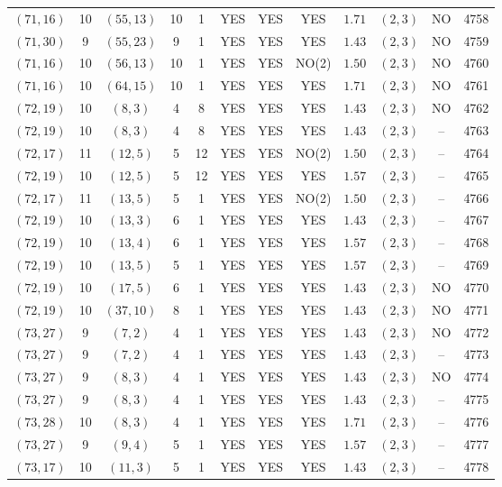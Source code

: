 \begin{longtable}{|c|c|c|c|c|c|c|c|c|c|c|c|}
$(71,16)$ & 10 & $(55,13)$ & 10 & 1 & YES & YES & YES & $1.71$ & $(2,3)$ & NO & 4758\\
$(71,30)$ & 9 & $(55,23)$ & 9 & 1 & YES & YES & YES & $1.43$ & $(2,3)$ & NO & 4759\\
$(71,16)$ & 10 & $(56,13)$ & 10 & 1 & YES & YES & NO(2) & $1.50$ & $(2,3)$ & NO & 4760\\
$(71,16)$ & 10 & $(64,15)$ & 10 & 1 & YES & YES & YES & $1.71$ & $(2,3)$ & NO & 4761\\
$(72,19)$ & 10 & $(8,3)$ & 4 & 8 & YES & YES & YES & $1.43$ & $(2,3)$ & NO & 4762\\
$(72,19)$ & 10 & $(8,3)$ & 4 & 8 & YES & YES & YES & $1.43$ & $(2,3)$ & -- & 4763\\
$(72,17)$ & 11 & $(12,5)$ & 5 & 12 & YES & YES & NO(2) & $1.50$ & $(2,3)$ & -- & 4764\\
$(72,19)$ & 10 & $(12,5)$ & 5 & 12 & YES & YES & YES & $1.57$ & $(2,3)$ & -- & 4765\\
$(72,17)$ & 11 & $(13,5)$ & 5 & 1 & YES & YES & NO(2) & $1.50$ & $(2,3)$ & -- & 4766\\
$(72,19)$ & 10 & $(13,3)$ & 6 & 1 & YES & YES & YES & $1.43$ & $(2,3)$ & -- & 4767\\
$(72,19)$ & 10 & $(13,4)$ & 6 & 1 & YES & YES & YES & $1.57$ & $(2,3)$ & -- & 4768\\
$(72,19)$ & 10 & $(13,5)$ & 5 & 1 & YES & YES & YES & $1.57$ & $(2,3)$ & -- & 4769\\
$(72,19)$ & 10 & $(17,5)$ & 6 & 1 & YES & YES & YES & $1.43$ & $(2,3)$ & NO & 4770\\
$(72,19)$ & 10 & $(37,10)$ & 8 & 1 & YES & YES & YES & $1.43$ & $(2,3)$ & NO & 4771\\
$(73,27)$ & 9 & $(7,2)$ & 4 & 1 & YES & YES & YES & $1.43$ & $(2,3)$ & NO & 4772\\
$(73,27)$ & 9 & $(7,2)$ & 4 & 1 & YES & YES & YES & $1.43$ & $(2,3)$ & -- & 4773\\
$(73,27)$ & 9 & $(8,3)$ & 4 & 1 & YES & YES & YES & $1.43$ & $(2,3)$ & NO & 4774\\
$(73,27)$ & 9 & $(8,3)$ & 4 & 1 & YES & YES & YES & $1.43$ & $(2,3)$ & -- & 4775\\
$(73,28)$ & 10 & $(8,3)$ & 4 & 1 & YES & YES & YES & $1.71$ & $(2,3)$ & -- & 4776\\
$(73,27)$ & 9 & $(9,4)$ & 5 & 1 & YES & YES & YES & $1.57$ & $(2,3)$ & -- & 4777\\
$(73,17)$ & 10 & $(11,3)$ & 5 & 1 & YES & YES & YES & $1.43$ & $(2,3)$ & -- & 4778\\

\end{longtable}
